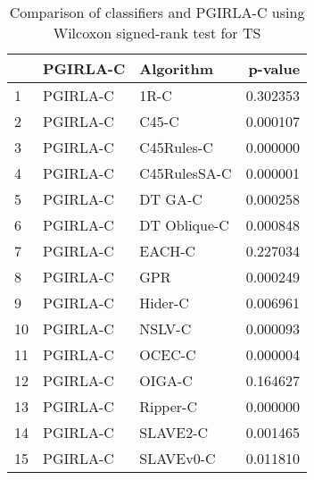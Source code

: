 \begin{table}
\footnotesize
\caption{Comparison of classifiers and PGIRLA-C using Wilcoxon signed-rank test for TS}
\label{tab:PGIRLA-C wilcoxon TS comparison}
\begin{tabular}{lllr}
\hline
 & PGIRLA-C & Algorithm & p-value \\
\hline
1 & PGIRLA-C & 1R-C & 0.302353 \\
2 & PGIRLA-C & C45-C & 0.000107 \\
3 & PGIRLA-C & C45Rules-C & 0.000000 \\
4 & PGIRLA-C & C45RulesSA-C & 0.000001 \\
5 & PGIRLA-C & DT GA-C & 0.000258 \\
6 & PGIRLA-C & DT Oblique-C & 0.000848 \\
7 & PGIRLA-C & EACH-C & 0.227034 \\
8 & PGIRLA-C & GPR & 0.000249 \\
9 & PGIRLA-C & Hider-C & 0.006961 \\
10 & PGIRLA-C & NSLV-C & 0.000093 \\
11 & PGIRLA-C & OCEC-C & 0.000004 \\
12 & PGIRLA-C & OIGA-C & 0.164627 \\
13 & PGIRLA-C & Ripper-C & 0.000000 \\
14 & PGIRLA-C & SLAVE2-C & 0.001465 \\
15 & PGIRLA-C & SLAVEv0-C & 0.011810 \\
\hline
\end{tabular}
\end{table}
